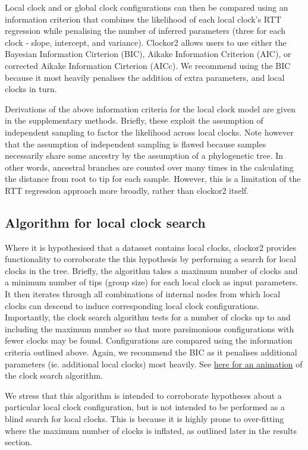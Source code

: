 \documentclass{article}
\begin{document}
Local clock and or global clock configurations can then be compared using an information criterion that combines the likelihood of each local clock's RTT regression while penalising the number of inferred parameters (three for each clock - slope, intercept, and variance). Clockor2 allows users to use either the Bayesian Information Cirterion (BIC), Aikake Information Criterion (AIC), or corrected Aikake Information Cirterion (AICc). We recommend using the BIC because it most heavily penalises the addition of extra parameters, and local clocks in turn.

Derivations of the above information criteria for the local clock model are given in the supplementary methods. Briefly, these exploit the assumption of independent sampling to factor the likelihood across local clocks. Note however that the assumption of independent sampling is flawed because samples necessarily share some ancestry by the assumption of a phylogenetic tree. In other words, ancestral branches are counted over many times in the calculating the distance from root to tip for each sample. However, this is a limitation of the RTT regression approach more broadly, rather than clockor2 itself.


\subsection*{Algorithm for local clock search}
Where it is hypothesised that a datasset contains local clocks, clockor2 provides functionality to corroborate the this hypothesis by performing a search for local clocks in the tree. Briefly, the algorithm takes a maximum number of clocks and a minimum number of tips (group size) for each local clock as input parameters. It then iterates through all combinations of internal nodes from which local clocks can descend to induce corresponding local clock configurations. Importantly, the clock search algorithm tests for a number of clocks up to and including the maximum number so that more parsimonious configurations with fewer clocks may be found. Configurations are compared using the information criteria outlined above. Again, we recommend the BIC as it penalises additional parameters (ie. additional local clocks) most heavily. See \href{https://github.com/LeoFeatherstone/clockor2Paper/blob/main/figures/clockSearchEg2Clocks.gif}{here for an animation} of the clock search algorithm. 

We stress that this algorithm is intended to corroborate hypotheses about a particular local clock configuration, but is not intended to be performed as a blind search for local clocks. This is because it is highly prone to over-fitting where the maximum number of clocks is inflated, as outlined later in the results section.
\end{document}
